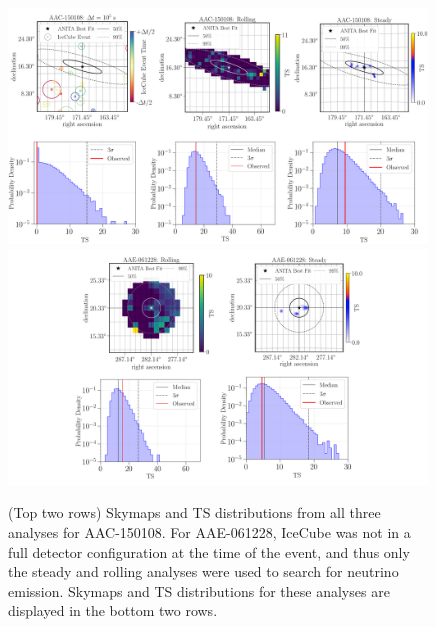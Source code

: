 \begin{figure}
    \centering
    \includegraphics[width=0.99\textwidth]{figures/ANITA/AAC-150108_collab_paper_plots.pdf}
    \includegraphics[width=0.99\textwidth]{figures/ANITA/AAE-061228_collab_paper_plots.pdf}
    \caption[AAE-061228 and AAE-150108 Skymaps]{(Top two rows) Skymaps and TS distributions from all three analyses for AAC-150108. For AAE-061228, IceCube was not in a full detector configuration at the time of the event, and thus only the steady and rolling analyses were used to search for neutrino emission. Skymaps and TS distributions for these analyses are displayed in the bottom two rows.} \label{fig:ANITA_skymaps_extra}
\end{figure}



